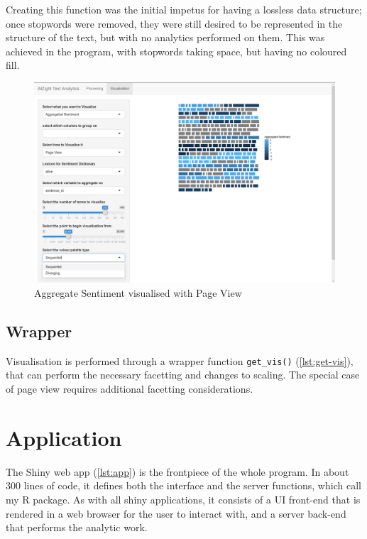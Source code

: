 \documentclass[11pt, a4paper, titlepage]{report}
\begin{document}
Creating this function was the initial impetus for having a lossless
data structure; once stopwords were removed, they were still desired
to be represented in the structure of the text, but with no analytics
performed on them. This was achieved in the program, with stopwords
taking space, but having no coloured fill.

\begin{figure}
  \centering
  \includegraphics[scale=0.35]{visualisation-agg-sent-pageview.png}
  \caption{Aggregate Sentiment visualised with Page
    View\label{fig:visualisation-agg-sent-pageview}}
\end{figure}

\subsection{Wrapper}\label{sec:wrapper-1}

Visualisation is performed through a wrapper function
\texttt{get_vis()} (\underline{\cref{lst:get-vis}}), that can
perform the necessary facetting and changes to scaling. The special
case of page view requires additional facetting considerations.

\section{Application}\label{sec:application}

The Shiny web app (\underline{\cref{lst:app}}) is the
frontpiece of the whole program. In about 300 lines of code, it
defines both the interface and the server functions, which call my R
package. As with all shiny applications, it consists of a UI front-end
that is rendered in a web browser for the user to interact with, and a
server back-end that performs the analytic work.
\end{document}
